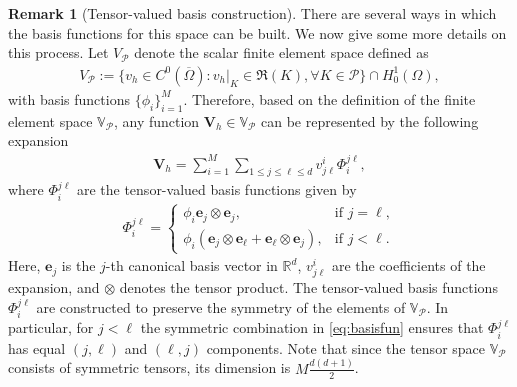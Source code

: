 \documentclass[final,12pt]{amsart}
\theoremstyle{plain}
\theoremstyle{definition}
\newtheorem{Remark}[theorem]{Remark}
\newcommand\calP{{\mathcal{P}}}
\newcommand\bV{\mathbf{V}}
\begin{document}
\begin{Remark}[Tensor-valued basis construction]
There are several ways in which the basis functions for this space can be built.  We now give some
more details on this process. 
Let $V_\calP$ denote the scalar finite element space defined as
\begin{align}
	V_\calP := \{v_h \in C^0(\overline{\Omega}) : v_h|_K \in \mathfrak{R}(K), \forall K \in \calP\} \cap H^1_0(\Omega),
\end{align}
with basis functions $\{\phi_i\}_{i=1}^M$.
Therefore, based on the definition of the finite element space $\mathbb{V}_{\calP}$, any function $\bV_{h} \in \mathbb{V}_{\calP} $ can be represented by the following expansion
\begin{align}
	\bV_{h}=\sum_{i=1}^{M} \sum_{1 \leq j \leq \ell \leq d}v_{j\ell}^i\Phi^{j\ell}_{i}, \label{lagrange}
\end{align}
where $\Phi^{j\ell}_{i}$ are the tensor-valued basis functions given by
\begin{align}
	\Phi^{j\ell}_{i}=
	\begin{cases}
		\phi_{i}\mathbf{e}_j \otimes \mathbf{e}_j, & \text{if } j = \ell, \\
		\phi_{i}(\mathbf{e}_j \otimes \mathbf{e}_{\ell} + \mathbf{e}_{\ell} \otimes \mathbf{e}_j), & \text{if } j < \ell.
	\end{cases} \label{eq:basisfun}
\end{align}
Here,   $\mathbf{e}_j$ is the $j$-th canonical basis vector in $\mathbb{R}^d$, $v_{j\ell}^i$ are the coefficients of the expansion, and $\otimes$ denotes the tensor product. The tensor-valued basis functions $\Phi^{j\ell}_{i}$ are constructed to preserve the symmetry of the elements of $\mathbb{V}_{\calP}$.
In particular, for $j<\ell$ the symmetric combination in \eqref{eq:basisfun} ensures that $\Phi^{j\ell}_{i}$ has equal $(j,\ell)$ and $(\ell,j)$ components.
Note that since the tensor space $\mathbb{V}_{\calP}$ consists of symmetric tensors, its dimension is $M \frac{d(d+1)}{2}$.
\end{Remark}
\end{document}
